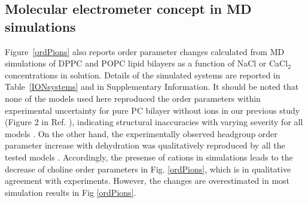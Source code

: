 \documentclass[pre,aps,floatfix,authordate1-4,twocolumn]{revtex4-1}
\begin{document}
\subsection{Molecular electrometer concept in MD simulations}\label{electrometerinsimulations}

Figure~\ref{ordPions} also reports order parameter changes calculated from MD simulations
of DPPC and POPC lipid bilayers as a function of NaCl or CaCl$_2$ concentrations in solution. 
Details of the simulated systems are reported in Table~\ref{IONsystems} and in Supplementary Information. 
It should be noted that none of the models used here 
reproduced the order parameters within experimental uncertainty
for pure PC bilayer without ions in our previous study (Figure 2 in Ref. \cite{botan15}), 
indicating structural inaccuracies with varying severity for all models \cite{botan15}.
On the other hand, the experimentally observed headgroup order parameter increase with dehydration
was qualitatively reproduced by all the tested models \cite{botan15}. 
Accordingly, the presense of cations in simulations leads to the decrease 
of choline order parameters in Fig. \ref{ordPions}, which is in qualitative
agreement with experiments. However, the changes are overestimated in most
simulation results in Fig \ref{ordPions}. 
\end{document}
